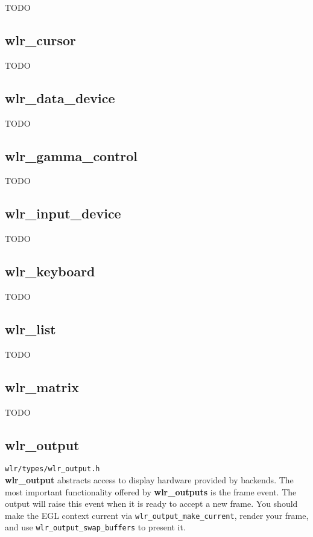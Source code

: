 \documentclass{article}
\newcommand{\code}[1]{\texttt{#1}}
\begin{document}
TODO

\subsection{wlr_cursor}\label{wlr cursor}

TODO

\subsection{wlr_data_device}\label{wlr data device}

TODO

\subsection{wlr_gamma_control}\label{wlr gamma control}

TODO

\subsection{wlr_input_device}\label{wlr input device}

TODO

\subsection{wlr_keyboard}\label{wlr keyboard}

TODO

\subsection{wlr_list}\label{wlr list}

TODO

\subsection{wlr_matrix}\label{wlr matrix}

TODO

\subsection{wlr_output}\label{wlr output}

\code{wlr/types/wlr_output.h}\\

\textbf{wlr_output} abstracts access to display hardware provided by backends.
The most important functionality offered by \textbf{wlr_outputs} is the frame
event. The output will raise this event when it is ready to accept a new frame.
You should make the EGL context current via \code{wlr_output_make_current},
render your frame, and use \code{wlr_output_swap_buffers} to present it.\\
\end{document}
